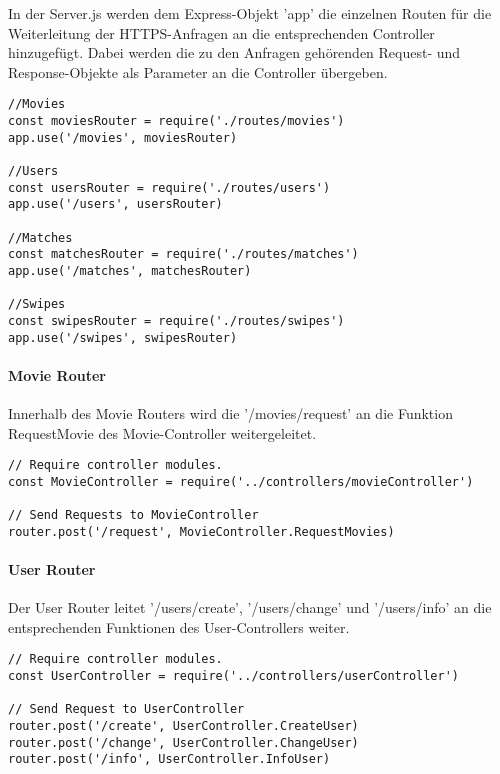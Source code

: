 In der Server.js werden dem Express-Objekt 'app' die einzelnen Routen für die Weiterleitung der HTTPS-Anfragen an die entsprechenden Controller hinzugefügt. Dabei werden die zu den Anfragen gehörenden Request- und Response-Objekte als Parameter an die Controller übergeben.

\begin{lstlisting}[caption=Routing in server.js, label=lst:routingserver]
//Movies
const moviesRouter = require('./routes/movies')
app.use('/movies', moviesRouter)

//Users
const usersRouter = require('./routes/users')
app.use('/users', usersRouter)

//Matches
const matchesRouter = require('./routes/matches')
app.use('/matches', matchesRouter)

//Swipes
const swipesRouter = require('./routes/swipes')
app.use('/swipes', swipesRouter)

\end{lstlisting}

\paragraph{Movie Router}
Innerhalb des Movie Routers wird die '/movies/request' an die Funktion RequestMovie des Movie-Controller weitergeleitet.
\begin{lstlisting}[caption=Routing in movieRouter.js, label=lst:routingmovie]
// Require controller modules.
const MovieController = require('../controllers/movieController')

// Send Requests to MovieController
router.post('/request', MovieController.RequestMovies)
\end{lstlisting}

\paragraph{User Router}
Der User Router leitet '/users/create', '/users/change' und '/users/info' an die entsprechenden Funktionen des User-Controllers weiter.
\begin{lstlisting}[caption=Routing in userRouter.js, label=lst:routinguser]
// Require controller modules.
const UserController = require('../controllers/userController')

// Send Request to UserController
router.post('/create', UserController.CreateUser)
router.post('/change', UserController.ChangeUser)
router.post('/info', UserController.InfoUser)
\end{lstlisting}

